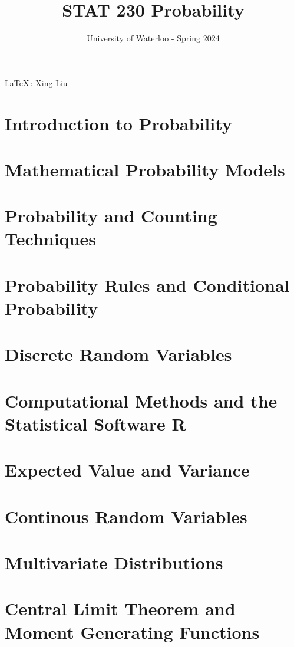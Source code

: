 \documentclass{article}
\title{STAT 230 Probability}
\author{University of Waterloo - Spring 2024}
\begin{document}
\maketitle

\vspace{-3mm}
\begin{center}
    \large \LaTeX \,: Xing Liu
\end{center}

\tableofcontentsnewpage{}

\section{Introduction to Probability}


\section{Mathematical Probability Models}


\section{Probability and Counting Techniques}


\section{Probability Rules and Conditional Probability}


\section{Discrete Random Variables}


\section{Computational Methods and the Statistical Software R}


\section{Expected Value and Variance}


\section{Continous Random Variables}


\section{Multivariate Distributions}


\section{Central Limit Theorem and Moment Generating Functions}

\end{document}
